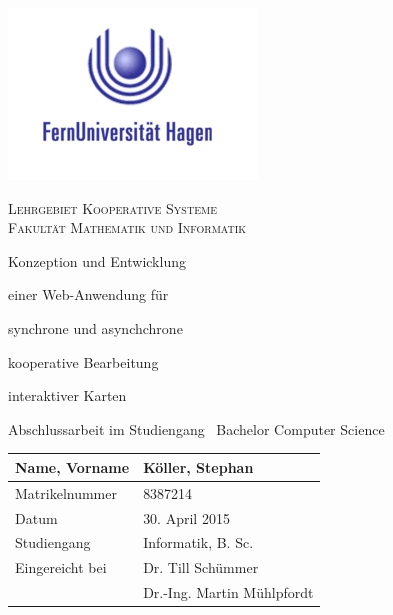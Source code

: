 \thispagestyle{empty}
\vspace{3cm}
  \begin{center}
	

  \includegraphics[scale=0.8]{bilder/fernuni-logo.png}\\ \vspace{0.8cm}

  \scshape Lehrgebiet Kooperative Systeme\\
  \scshape Fakultät Mathematik und Informatik
  \vspace{1cm}

  \bfseries{\Large{Konzeption und Entwicklung

einer Web-Anwendung für

synchrone und asynchchrone

kooperative Bearbeitung

interaktiver Karten

}}

  \vspace{2cm}

	Abschlussarbeit im Studiengang \
	Bachelor Computer Science 

  \vspace{4cm}
  \renewcommand{\arraystretch}{1.5}
	\begin{table}[ht!]
		\centering
		\begin{tabulary}{\columnwidth}{|L|L|}
		\hline
			Name, Vorname & Köller, Stephan\\ \hline
			Matrikelnummer & 8387214\\ \hline
			Datum & 30. April 2015\\ \hline
			Studiengang & Informatik, B. Sc.\\ \hline
			Eingereicht bei & Dr. Till Schümmer\\
			& Dr.-Ing. Martin Mühlpfordt\\ \hline
		\end{tabulary}
	\end{table}

  \end{center}

